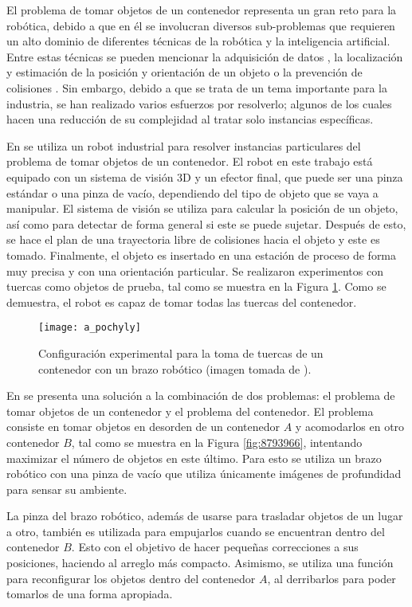 El problema de tomar objetos de un contenedor representa un gran reto para la robótica, debido a que en él se involucran diversos sub-problemas que requieren un alto dominio de diferentes técnicas de la robótica y la inteligencia artificial.
Entre estas técnicas se pueden mencionar la adquisición de datos \cite{CHEN1992145}, la localización y estimación de la posición y orientación de un objeto \cite{5152739} o la prevención de colisiones \cite{6239716}\cite{5756828}.
Sin embargo, debido a que se trata de un tema importante para la industria, se han realizado varios esfuerzos por resolverlo; algunos de los cuales hacen una reducción de su complejidad al tratar solo instancias específicas.

En \cite{5756828} se utiliza un robot industrial para resolver instancias particulares del problema de tomar objetos de un contenedor.
El robot en este trabajo está equipado con un sistema de visión 3D y un efector final, que puede ser una pinza estándar o una pinza de vacío, dependiendo del tipo de objeto que se vaya a manipular.
El sistema de visión se utiliza para calcular la posición de un objeto, así como para detectar de forma general si este se puede sujetar.
Después de esto, se hace el plan de una trayectoria libre de colisiones hacia el objeto y este es tomado.
Finalmente, el objeto es insertado en una estación de proceso de forma muy precisa y con una orientación particular.
Se realizaron experimentos con tuercas como objetos de prueba, tal como se muestra en la Figura \ref{fig:5756828}.
Como se demuestra, el robot es capaz de tomar todas las tuercas del contenedor.
%
\begin{figure}[H]
	\texttt{[image: a\_pochyly]}%
	\caption{Configuración experimental para la toma de tuercas de un contenedor con un brazo robótico (imagen tomada de \cite{5756828}).}%
	\label{fig:5756828}%
\end{figure}
%
En \cite{8793966} se presenta una solución a la combinación de dos problemas: el problema de tomar objetos de un contenedor y el problema del contenedor.
El problema consiste en tomar objetos en desorden de un contenedor $A$ y acomodarlos en otro contenedor $B$, tal como se muestra en la Figura \ref{fig:8793966}, intentando maximizar el número de objetos en este último.
Para esto se utiliza un brazo robótico con una pinza de vacío que utiliza únicamente imágenes de profundidad para sensar su ambiente.

La pinza del brazo robótico, además de usarse para trasladar objetos de un lugar a otro, también es utilizada para empujarlos cuando se encuentran dentro del contenedor $B$.
Esto con el objetivo de hacer pequeñas correcciones a sus posiciones, haciendo al arreglo más compacto.
Asimismo, se utiliza una función para reconfigurar los objetos dentro del contenedor $A$, al derribarlos para poder tomarlos de una forma apropiada.

